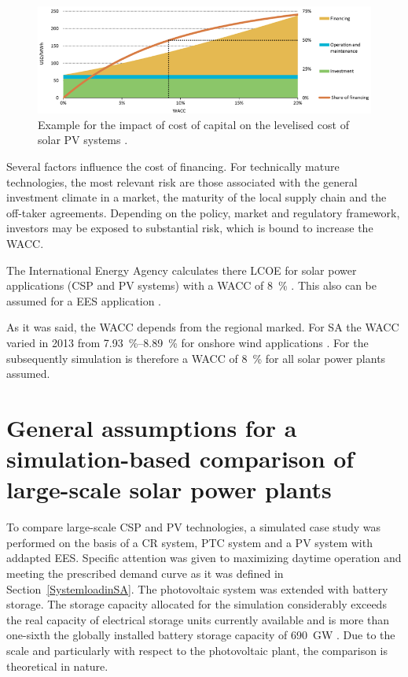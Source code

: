 \begin{figure}[htbp]  
\centering
\includegraphics[width=1\linewidth]{FIG/WACC}
\caption[Example for the impact of cost of capital on the levelised cost of solar PV systems.]{Example for the impact of cost of capital on the levelised cost of solar PV systems \cite{IEA2015}.}\label{WACC}
\end{figure}
Several factors influence the cost of financing. For technically mature technologies, the most relevant risk are those associated with the general investment climate in a market, the maturity of the local supply chain and the off-taker agreements. Depending on the policy, market and regulatory framework, investors may be exposed to substantial risk, which is bound to increase the WACC. \cite{IEA2014c} 

The International Energy Agency calculates there LCOE for solar power applications (CSP and PV systems) with a WACC of \SI{8}{\percent} \cite{IEA2014c}. This also can be assumed for a EES application \cite{Zakeri2015}.

As it was said, the WACC depends from the regional marked. For SA the WACC varied in 2013 from \SIrange{7.93}{8.89}{\percent} for onshore wind applications \cite{IEA2015}. For the subsequently simulation is therefore a WACC of \SI{8}{\percent} for all solar power plants assumed.

\pagebreak
\section{General assumptions for a simulation-based comparison of large-scale solar power plants}
To compare large-scale CSP and PV technologies, a simulated case study was performed on the basis of a CR system, PTC system and a PV system with addapted EES. Specific attention was given to maximizing daytime operation and meeting the prescribed demand curve as it was defined in Section~\ref{SystemloadinSA}. The photovoltaic system was extended with battery storage. The storage capacity allocated for the simulation considerably exceeds the real capacity of electrical storage units currently available and is more than one-sixth the globally installed battery storage capacity of \SI{690}{GW} \cite{IEA2015}. Due to the scale and particularly with respect to the photovoltaic plant, the comparison is theoretical in nature.

